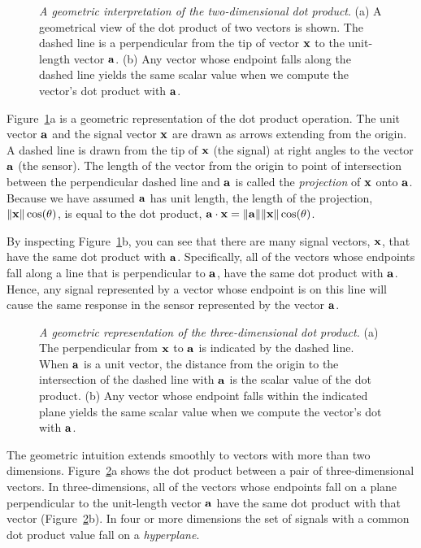 \begin{figure}
\centerline{
}
\caption[Dot Product Geometry in two dimensions]{
{\em A geometric interpretation of the two-dimensional dot product}.
(a) A geometrical view of the dot product of two vectors is shown.
The dashed line is a perpendicular from the tip of vector $\mbox{${\bf x}$}$ to
the unit-length vector $\mbox{${\bf a}$}$. (b) Any vector whose endpoint falls
along the dashed line yields the same scalar value when we compute the
vector's dot product with $\mbox{${\bf a}$}$.  }
\label{fa4:dotProduct}
\end{figure}
Figure~\ref{fa4:dotProduct}a is a geometric representation of the dot
product operation.  The unit vector $\mbox{${\bf a}$}$ and the signal vector
$\mbox{${\bf x}$}$ are drawn as arrows extending from the origin.  A dashed line
is drawn from the tip of $\mbox{${\bf x}$}$ (the signal) at right angles to the
vector $\mbox{${\bf a}$}$ (the sensor).  The length of the vector from the origin
to point of intersection between the perpendicular dashed line and
$\mbox{${\bf a}$}$ is called the {\em projection} of $\mbox{${\bf x}$}$ onto $\mbox{${\bf a}$}$.
Because we have assumed $\mbox{${\bf a}$}$ has unit length, the length of the
projection, $\| \mbox{${\bf x}$} \| \cos ( \theta )$, is equal to the dot
product, $\mbox{${\bf a}$} \cdot \mbox{${\bf x}$} = \| \mbox{${\bf a}$} \| \| \mbox{${\bf x}$} \| \cos (\theta)$.

By inspecting Figure~\ref{fa4:dotProduct}b, you can see that there are
many signal vectors, $\mbox{${\bf x}$}$, that have the same dot product with
$\mbox{${\bf a}$}$. Specifically, all of the vectors whose endpoints fall along a
line that is perpendicular to $\mbox{${\bf a}$}$, have the same dot product with
$\mbox{${\bf a}$}$.  Hence, any signal represented by a vector whose endpoint is
on this line will cause the same response in the sensor represented by
the vector $\mbox{${\bf a}$}$.

\begin{figure}
\centerline{
}
\caption[Dot product geometry in three dimensions]{
{\em A geometric representation of the three-dimensional dot product.}
(a) The perpendicular from $\mbox{${\bf x}$}$ to $\mbox{${\bf a}$}$ is indicated by the
dashed line.  When $\mbox{${\bf a}$}$ is a unit vector, the distance from the
origin to the intersection of the dashed line with $\mbox{${\bf a}$}$ is the
scalar value of the dot product.  (b) Any vector whose endpoint falls
within the indicated plane yields the same scalar value when we
compute the vector's dot with $\mbox{${\bf a}$}$.  }
\label{fa4:dotProduct3}
\end{figure}
The geometric intuition extends smoothly to vectors with more than two
dimensions.  Figure~\ref{fa4:dotProduct3}a shows the dot product
between a pair of three-dimensional vectors.  In three-dimensions, all
of the vectors whose endpoints fall on a plane perpendicular to the
unit-length vector $\mbox{${\bf a}$}$ have the same dot product with that vector
(Figure~\ref{fa4:dotProduct3}b).  In four or more dimensions the set
of signals with a common dot product value fall on a {\em hyperplane}.


